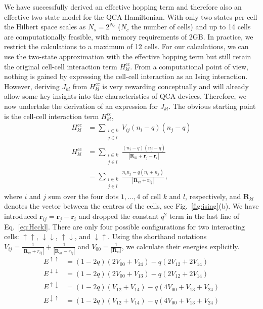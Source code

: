 We have successfully derived an effective hopping term and therefore also an
effective two-state model for the QCA Hamiltonian. With only two states per cell
the Hilbert space scales as $N_s = 2^{N_c}$ ($N_c$ the number of cells) and up
to 14 cells are computationally feasible, with memory requirements of 2GB. In
practice, we restrict the calculations to a maximum of 12 cells. For our
calculations, we can use the two-state approximation with the effective hopping
term but still retain the original cell-cell interaction term $H^{cc}_{kl}$.
From a computational point of view, nothing is gained by expressing the
cell-cell interaction as an Ising interaction. However, deriving $J_{kl}$ from
$H^{cc}_{kl}$ is very rewarding conceptually and will already allow some key
insights into the characteristics of QCA devices. Therefore, we now undertake
the derivation of an expression for $J_{kl}$. The obvious starting point is the
cell-cell interaction term $H^{cc}_{kl}$, 
%
\begin{equation}
\begin{split}
\label{eq:Hcckl}
  H^{cc}_{kl} 
  &=
  \sum_{\substack{i \in k\\j \in l}} V_{ij} \left( n_i - q \right) \left( n_j - q \right) \\
  H^{cc}_{kl}
  &= 
  \sum_{\substack{i \in k\\j \in l}}
  \frac{ \left( n_i - q \right) \left( n_j - q \right) }
       { \left| \bm{R}_{kl} + \bm{r}_j - \bm{r}_i \right| } \\
  &=
  \sum_{\substack{i \in k\\j \in l}}
  \frac{n_i n_j - q (n_i + n_j)}
       {\left| \bm{R}_{kl} + \bm{r}_{ij} \right|} \, ,
\end{split}
\end{equation}
%
where $i$ and $j$ sum over the four dots $1, \ldots, 4$ of cell $k$ and $l$,
respectively, and $\bm{R}_{kl}$ denotes the vector between the centres of the
cells, see Fig.~\ref{fig:ising}(b). We have introduced $\bm{r}_{ij} = \bm{r}_j -
\bm{r}_i$ and dropped the constant $q^2$ term in the last line of
Eq.~\eqref{eq:Hcckl}. There are only four possible configurations for two
interacting cells: $\uparrow\uparrow$, $\downarrow\downarrow$,
$\uparrow\downarrow$, and $\downarrow\uparrow$. Using the shorthand notations
$V_{ij} = \frac{1}{\left| \bm{R}_{kl} + r_{ij} \right|} + \frac{1}{\left|
\bm{R}_{kl} - r_{ij} \right|}$ and $V_{00} = \frac{1}{\left| \bm{R}_{kl}
\right|}$, we calculate their energies explicitly.
\begin{align}
  E^{\uparrow\uparrow}
  &=
  \left( 1 - 2 q \right) \left( 2 V_{00} + V_{24} \right)
  - q \left( 2 V_{12} + 2 V_{14} \right)
  \\
  E^{\downarrow\downarrow}
  &=
  \left( 1 - 2 q \right) \left( 2 V_{00} + V_{13} \right)
  - q \left( 2 V_{12} + 2 V_{14} \right)
  \\
  E^{\uparrow\downarrow}
  &=
  \left( 1 - 2 q \right) \left( V_{12} + V_{14} \right)
  - q \left( 4 V_{00} + V_{13} + V_{24} \right)
  \\
  E^{\downarrow\uparrow}
  &=
  \left( 1 - 2 q \right) \left( V_{12} + V_{14} \right)
  - q \left( 4 V_{00} + V_{13} + V_{24} \right)
\end{align}
